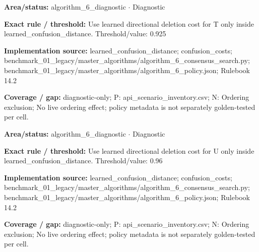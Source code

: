 \begin{tcolorbox}[enhanced,breakable,colback=white,colframe=Muted!45,boxrule=0.45pt,arc=1.5pt,left=6pt,right=6pt,top=5pt,bottom=5pt,title={\texttt{A6-LEARNED-DELETION-T}},title after break={\texttt{A6-LEARNED-DELETION-T}\ (continued)},fonttitle=\headingfont\bfseries\color{Navy},coltitle=Navy]
\textbf{Area/status:} algorithm\_\allowbreak{}6\_\allowbreak{}diagnostic $\boldsymbol{\cdot}$ Diagnostic\par
\smallskip
\textbf{Exact rule / threshold:} Use learned directional deletion cost for T only inside learned\_\allowbreak{}confusion\_\allowbreak{}distance. Threshold/\allowbreak{}value: 0.925\par
\smallskip
\textbf{Implementation source:} learned\_\allowbreak{}confusion\_\allowbreak{}distance; confusion\_\allowbreak{}costs; benchmark\_\allowbreak{}01\_\allowbreak{}legacy/\allowbreak{}master\_\allowbreak{}algorithms/\allowbreak{}algorithm\_\allowbreak{}6\_\allowbreak{}consensus\_\allowbreak{}search.py; benchmark\_\allowbreak{}01\_\allowbreak{}legacy/\allowbreak{}master\_\allowbreak{}algorithms/\allowbreak{}algorithm\_\allowbreak{}6\_\allowbreak{}policy.json; Rulebook 14.2\par
\smallskip
\textbf{Coverage / gap:} diagnostic-only; P: api\_\allowbreak{}scenario\_\allowbreak{}inventory.csv; N: Ordering exclusion; No live ordering effect; policy metadata is not separately golden-tested per cell.
\end{tcolorbox}
\begin{tcolorbox}[enhanced,breakable,colback=white,colframe=Muted!45,boxrule=0.45pt,arc=1.5pt,left=6pt,right=6pt,top=5pt,bottom=5pt,title={\texttt{A6-LEARNED-DELETION-U}},title after break={\texttt{A6-LEARNED-DELETION-U}\ (continued)},fonttitle=\headingfont\bfseries\color{Navy},coltitle=Navy]
\textbf{Area/status:} algorithm\_\allowbreak{}6\_\allowbreak{}diagnostic $\boldsymbol{\cdot}$ Diagnostic\par
\smallskip
\textbf{Exact rule / threshold:} Use learned directional deletion cost for U only inside learned\_\allowbreak{}confusion\_\allowbreak{}distance. Threshold/\allowbreak{}value: 0.96\par
\smallskip
\textbf{Implementation source:} learned\_\allowbreak{}confusion\_\allowbreak{}distance; confusion\_\allowbreak{}costs; benchmark\_\allowbreak{}01\_\allowbreak{}legacy/\allowbreak{}master\_\allowbreak{}algorithms/\allowbreak{}algorithm\_\allowbreak{}6\_\allowbreak{}consensus\_\allowbreak{}search.py; benchmark\_\allowbreak{}01\_\allowbreak{}legacy/\allowbreak{}master\_\allowbreak{}algorithms/\allowbreak{}algorithm\_\allowbreak{}6\_\allowbreak{}policy.json; Rulebook 14.2\par
\smallskip
\textbf{Coverage / gap:} diagnostic-only; P: api\_\allowbreak{}scenario\_\allowbreak{}inventory.csv; N: Ordering exclusion; No live ordering effect; policy metadata is not separately golden-tested per cell.
\end{tcolorbox}
